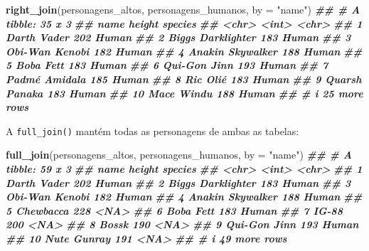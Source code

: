 \documentclass[
  portuguese,
  11pt,
  openany]{book}
\newenvironment{Shaded}{\begin{snugshade}}{\end{snugshade}}
\newcommand{\AttributeTok}[1]{\textcolor[rgb]{0.13,0.29,0.53}{#1}}
\newcommand{\DocumentationTok}[1]{\textcolor[rgb]{0.56,0.35,0.01}{\textbf{\textit{#1}}}}
\newcommand{\FunctionTok}[1]{\textcolor[rgb]{0.13,0.29,0.53}{\textbf{#1}}}
\newcommand{\NormalTok}[1]{#1}
\newcommand{\StringTok}[1]{\textcolor[rgb]{0.31,0.60,0.02}{#1}}
\begin{document}
\begin{Shaded}
\begin{Highlighting}[]
\FunctionTok{right\_join}\NormalTok{(personagens\_altos, personagens\_humanos, }\AttributeTok{by =} \StringTok{"name"}\NormalTok{)}
\DocumentationTok{\#\# \# A tibble: 35 x 3}
\DocumentationTok{\#\#    name              height species}
\DocumentationTok{\#\#    \textless{}chr\textgreater{}              \textless{}int\textgreater{} \textless{}chr\textgreater{}  }
\DocumentationTok{\#\#  1 Darth Vader          202 Human  }
\DocumentationTok{\#\#  2 Biggs Darklighter    183 Human  }
\DocumentationTok{\#\#  3 Obi{-}Wan Kenobi       182 Human  }
\DocumentationTok{\#\#  4 Anakin Skywalker     188 Human  }
\DocumentationTok{\#\#  5 Boba Fett            183 Human  }
\DocumentationTok{\#\#  6 Qui{-}Gon Jinn         193 Human  }
\DocumentationTok{\#\#  7 Padmé Amidala        185 Human  }
\DocumentationTok{\#\#  8 Ric Olié             183 Human  }
\DocumentationTok{\#\#  9 Quarsh Panaka        183 Human  }
\DocumentationTok{\#\# 10 Mace Windu           188 Human  }
\DocumentationTok{\#\# \# i 25 more rows}
\end{Highlighting}
\end{Shaded}

A \texttt{full\_join()} mantém todas as personagens de ambas as tabelas:

\begin{Shaded}
\begin{Highlighting}[]
\FunctionTok{full\_join}\NormalTok{(personagens\_altos, personagens\_humanos, }\AttributeTok{by =} \StringTok{"name"}\NormalTok{)}
\DocumentationTok{\#\# \# A tibble: 59 x 3}
\DocumentationTok{\#\#    name              height species}
\DocumentationTok{\#\#    \textless{}chr\textgreater{}              \textless{}int\textgreater{} \textless{}chr\textgreater{}  }
\DocumentationTok{\#\#  1 Darth Vader          202 Human  }
\DocumentationTok{\#\#  2 Biggs Darklighter    183 Human  }
\DocumentationTok{\#\#  3 Obi{-}Wan Kenobi       182 Human  }
\DocumentationTok{\#\#  4 Anakin Skywalker     188 Human  }
\DocumentationTok{\#\#  5 Chewbacca            228 \textless{}NA\textgreater{}   }
\DocumentationTok{\#\#  6 Boba Fett            183 Human  }
\DocumentationTok{\#\#  7 IG{-}88                200 \textless{}NA\textgreater{}   }
\DocumentationTok{\#\#  8 Bossk                190 \textless{}NA\textgreater{}   }
\DocumentationTok{\#\#  9 Qui{-}Gon Jinn         193 Human  }
\DocumentationTok{\#\# 10 Nute Gunray          191 \textless{}NA\textgreater{}   }
\DocumentationTok{\#\# \# i 49 more rows}
\end{Highlighting}
\end{Shaded}
\end{document}
